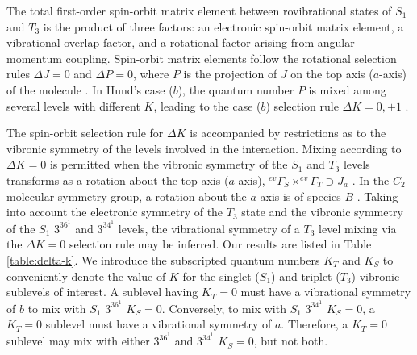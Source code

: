 \documentclass[12pt]{mitthesis}
\begin{document}

The total first-order spin-orbit matrix element between rovibrational
states of $S_1$ and $T_3$ is the product of three factors: an
electronic spin-orbit matrix element, a vibrational overlap factor,
and a rotational factor arising from angular momentum coupling.
Spin-orbit matrix elements follow the rotational selection rules
$\Delta J = 0$ and $\Delta P = 0$, where $P$ is the projection of $J$
on the top axis ($a$-axis) of the molecule \cite{hougen64}.  In Hund's
case ($b$), the quantum number $P$ is mixed among several levels with
different $K$, leading to the case ($b$) selection rule $\Delta K = 0,
\pm 1$ \cite{hougen64, stevens73}.

The spin-orbit selection rule for $\Delta K$ is accompanied by
restrictions as to the vibronic symmetry of the levels involved in the
interaction.  Mixing according to $\Delta K =0$ is permitted when the
vibronic symmetry of the $S_1$ and $T_3$ levels transforms as a
rotation about the top axis ($a$ axis), $^{ev}\Gamma_S \times
^{ev}\Gamma_T \supset J_a$ \cite{stevens73}.  In the $C_2$ molecular
symmetry group, a rotation about the $a$ axis is of species $B$
\cite{bunker98}.  Taking into account the electronic symmetry of the
$T_3$ state and the vibronic symmetry of the $S_1$ $3^36^1$ and
$3^34^1$ levels, the vibrational symmetry of a $T_3$ level mixing via
the $\Delta K=0$ selection rule may be inferred.  Our results are
listed in Table \ref{table:delta-k}.  We introduce the subscripted
quantum numbers $K_T$ and $K_S$ to conveniently denote the value of
$K$ for the singlet ($S_1$) and triplet ($T_3$) vibronic sublevels of
interest.  A sublevel having $K_T=0$ must have a vibrational symmetry
of $b$ to mix with $S_1$ $3^36^1$ $K_S=0$.  Conversely, to mix with
$S_1$ $3^34^1$ $K_S=0$, a $K_T=0$ sublevel must have a vibrational
symmetry of $a$.  Therefore, a $K_T=0$ sublevel may mix with either
$3^36^1$ and $3^34^1$ $K_S=0$, but not both.
\end{document}
